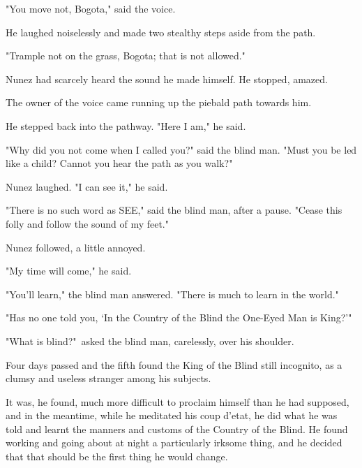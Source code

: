 \documentclass[submission]{sffms}
\begin{document}
"You move not, Bogota," said the voice.

He laughed noiselessly and made two stealthy steps aside from the
path.

"Trample not on the grass, Bogota; that is not allowed."

Nunez had scarcely heard the sound he made himself. He stopped,
amazed.

The owner of the voice came running up the piebald path towards him.

He stepped back into the pathway. "Here I am," he said.

"Why did you not come when I called you?" said the blind man. "Must
you be led like a child? Cannot you hear the path as you walk?"

Nunez laughed. "I can see it," he said.

"There is no such word as SEE," said the blind man, after a
pause. "Cease this folly and follow the sound of my feet."

Nunez followed, a little annoyed.

"My time will come," he said.

"You'll learn," the blind man answered. "There is much to learn in the
world."

"Has no one told you, `In the Country of the Blind the One-Eyed Man is
King?'"

"What is blind?"\ asked the blind man, carelessly, over his shoulder.

Four days passed and the fifth found the King of the Blind still
incognito, as a clumsy and useless stranger among his subjects.

It was, he found, much more difficult to proclaim himself than he had
supposed, and in the meantime, while he meditated his coup d'etat, he
did what he was told and learnt the manners and customs of the Country
of the Blind. He found working and going about at night a particularly
irksome thing, and he decided that that should be the first thing he
would change.
\end{document}
